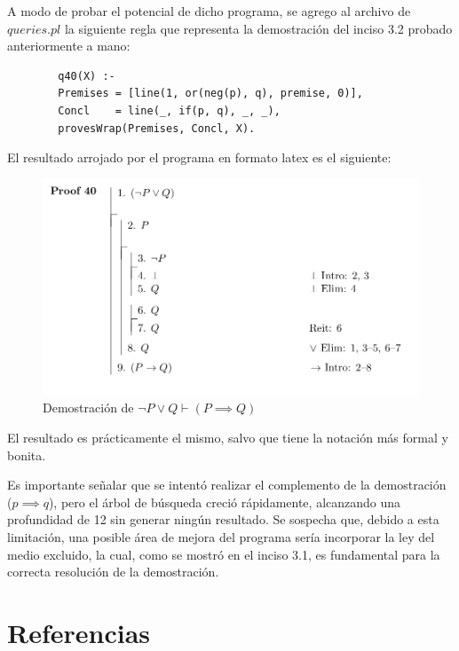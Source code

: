 \documentclass[11pt, letterpaper]{article}
\begin{document}
	\newpage
	
	A modo de probar el potencial de dicho programa, se agrego al archivo de $queries.pl$ la siguiente regla que representa la demostración del inciso 3.2 probado anteriormente a mano:
	
	
	\begin{verbatim}
		q40(X) :-                                    
		Premises = [line(1, or(neg(p), q), premise, 0)],  
		Concl    = line(_, if(p, q), _, _),    
		provesWrap(Premises, Concl, X).		
	\end{verbatim}

	El resultado arrojado por el programa en formato latex es el siguiente:

	\begin{figure}[h]
		\centering
		\includegraphics[width=1\textwidth]{IM1.png}  %
		\caption{Demostración de $\neg P \vee Q \vdash (P \implies Q)$}
		\label{fig:mi_imagen}
	\end{figure}
	
	
	El resultado es prácticamente el mismo, salvo que tiene la notación más formal y bonita.
		
	Es importante señalar que se intentó realizar el complemento de la demostración ($p \implies q$), pero el árbol de búsqueda creció rápidamente, alcanzando una profundidad de 12 sin generar ningún resultado. Se sospecha que, debido a esta limitación, una posible área de mejora del programa sería incorporar la ley del medio excluido, la cual, como se mostró en el inciso 3.1, es fundamental para la correcta resolución de la demostración.
	
		
\newpage


\section{Referencias}  %


	
	
\end{document}
